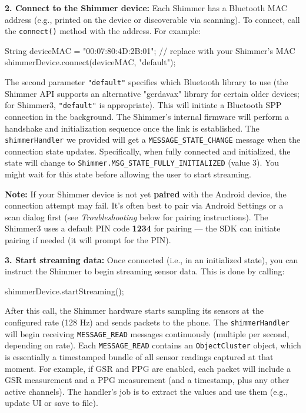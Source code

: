 \textbf{2. Connect to the Shimmer device:} Each Shimmer has a Bluetooth MAC
address (e.g., printed on the device or discoverable via scanning). To
connect, call the \texttt{connect()} method with the address. For example:

    String deviceMAC = "00:07:80:4D:2B:01";  // replace with your Shimmer's MAC
    shimmerDevice.connect(deviceMAC, "default");

The second parameter \texttt{"default"} specifies which Bluetooth library to
use (the Shimmer API supports an alternative "gerdavax" library for
certain older devices; for Shimmer3, \texttt{"default"} is
appropriate)\cite{SimulatorValidityPhysiological2025}\cite{GSRGuideIMotions}.
This will initiate a Bluetooth SPP connection in the background. The
Shimmer's internal firmware will perform a handshake and initialization
sequence once the link is established. The \texttt{shimmerHandler} we provided
will get a \texttt{MESSAGE_STATE_CHANGE} message when the connection state
updates. Specifically, when fully connected and initialized, the state
will change to \texttt{Shimmer.MSG_STATE_FULLY_INITIALIZED} (value
3)\cite{ElectrodermalActivityWiki}\cite{ElectrodermalActivityWiki}.
You might wait for this state before allowing the user to start
streaming.

\textbf{Note:} If your Shimmer device is not yet \textbf{paired} with the Android
device, the connection attempt may fail. It's often best to pair via
Android Settings or a scan dialog first (see \textit{Troubleshooting} below for
pairing instructions). The Shimmer3 uses a default PIN code \textbf{1234} for
pairing\cite{ElectrodermalActivityWiki}
--- the SDK can initiate pairing if needed (it will prompt for the PIN).

\textbf{3. Start streaming data:} Once connected (i.e., in an initialized
state), you can instruct the Shimmer to begin streaming sensor data.
This is done by calling:

    shimmerDevice.startStreaming();

After this call, the Shimmer hardware starts sampling its sensors at the
configured rate (128 Hz) and sends packets to the phone. The
\texttt{shimmerHandler} will begin receiving \texttt{MESSAGE_READ} messages
continuously (multiple per second, depending on rate). Each
\texttt{MESSAGE_READ} contains an \texttt{ObjectCluster} object, which is essentially
a timestamped bundle of all sensor readings captured at that moment. For
example, if GSR and PPG are enabled, each packet will include a GSR
measurement and a PPG measurement (and a timestamp, plus any other
active channels). The handler's job is to extract the values and use
them (e.g., update UI or save to file).

